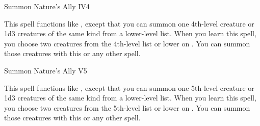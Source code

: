 \begin{spellsection}{Summon Nature's Ally IV}{4}
    \begin{spellheader}
    \end{spellheader}
    \begin{spellcontent}
        \begin{spelltargetinginfo}
        \end{spelltargetinginfo}
        \begin{spelleffects}
            \spellspecial This spell functions like , except that you can summon one 4th-level creature or 1d3 creatures of the same kind from a lower-level list. When you learn this spell, you choose two creatures from the 4th-level list or lower on . You can summon those creatures with this or any other  spell.
            \spelldur \durshort \dismissable
        \end{spelleffects}
    \end{spellcontent}
    \begin{spellfooter}
        \miscastexplode
    \end{spellfooter}
\end{spellsection}

\begin{spellsection}{Summon Nature's Ally V}{5}
    \begin{spellheader}
    \end{spellheader}
    \begin{spellcontent}
        \begin{spelltargetinginfo}
        \end{spelltargetinginfo}
        \begin{spelleffects}
            \spellspecial This spell functions like , except that you can summon one 5th-level creature or 1d3 creatures of the same kind from a lower-level list. When you learn this spell, you choose two creatures from the 5th-level list or lower on . You can summon those creatures with this or any other  spell.
            \spelldur \durshort \dismissable
        \end{spelleffects}
    \end{spellcontent}
    \begin{spellfooter}
        \miscastexplode
    \end{spellfooter}
\end{spellsection}

